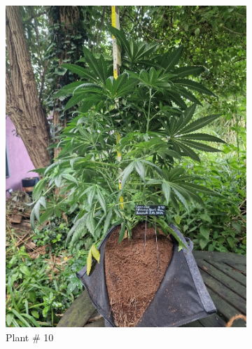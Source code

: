 \begin{figure}[htbp]
\begin{subfigure}[t]{.28\textwidth}
        \includegraphics[width=\linewidth]{plant_10_2024-06-17}
        \caption{Plant \# 10}
        \label{fig:plant_10_2024-06-17}
    \end{subfigure}
    \begin{subfigure}[t]{.28\textwidth}

\end{subfigure}
\end{figure}
